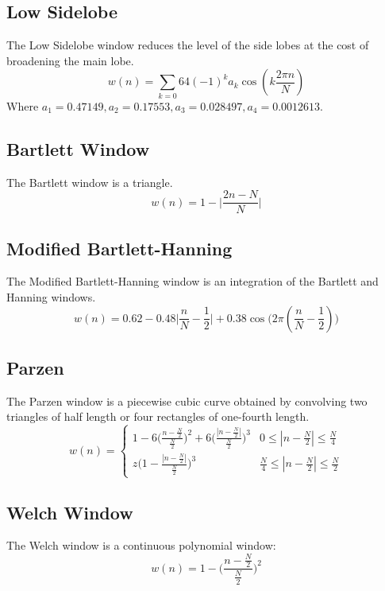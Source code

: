 \documentclass[oneside]{book}
\theoremstyle{mystyle}
\begin{document}
\subsection{Low Sidelobe}
\noindent The Low Sidelobe window reduces the level of the side lobes at the cost of broadening the main lobe. 
\begin{equation}
w(n) = \sum_{k=0}6{4} (-1)^{k}a_{k}\cos(k\frac{2\pi n}{N})
\end{equation}
\noindent Where $a_1 = 0.47149, a_{2} = 0.17553, a_{3} = 0.028497, a_{4} = 0.0012613$.
\subsection{Bartlett Window}
\noindent The Bartlett window is a triangle.
\begin{equation}
w(n) = 1-\big|\frac{2n-N}{N}\big|
\end{equation}
\subsection{Modified Bartlett-Hanning}
\noindent The Modified Bartlett-Hanning window is an integration of the Bartlett and Hanning windows. 
\begin{equation}
w(n) = 0.62-0.48\big|\frac{n}{N}-\frac{1}{2}\big|+0.38\cos\big(2\pi(\frac{n}{N}-\frac{1}{2})\big)
\end{equation}
\subsection{Parzen}
\noindent The Parzen window is a piecewise cubic curve obtained by convolving two triangles of half length or four rectangles of one-fourth length.
\begin{equation}
w(n) = \begin{cases} 1 - 6\big(\frac{n-\frac{N}{2}}{\frac{N}{2}}\big)^2+6\big(\frac{|n-\frac{N}{2}|}{\frac{N}{2}}\big)^3 & 0 \leq |n-\frac{N}{2}| \leq \frac{N}{4} \\ z\big(1 - \frac{|n-\frac{N}{2}|}{\frac{N}{2}}\big)^3 & \frac{N}{4} \leq |n-\frac{N}{2}|\leq \frac{N}{2} \end{cases}
\end{equation}
\subsection{Welch Window}
The Welch window is a continuous polynomial window:
\begin{equation}
w(n) = 1-\big(\frac{n-\frac{N}{2}}{\frac{N}{2}}\big)^2
\end{equation}
\end{document}
